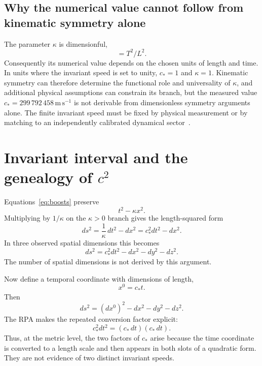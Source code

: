 \documentclass[11pt,a4paper]{article}
\newcommand{\kpar}{\kappa}
\newcommand{\cstar}{c_{\!*}}
\begin{document}
\subsection{Why the numerical value cannot follow from kinematic symmetry alone}
The parameter $\kpar$ is dimensionful,
\begin{equation}
[\kpar]=T^2/L^2.
\end{equation}
Consequently its numerical value depends on the chosen units of length and time. In units where the invariant speed is set to unity, $\cstar=1$ and $\kpar=1$. Kinematic symmetry can therefore determine the functional role and universality of $\kpar$, and additional physical assumptions can constrain its branch, but the measured value $\cstar=299\,792\,458\,\mathrm{m\,s^{-1}}$ is not derivable from dimensionless symmetry arguments alone. The finite invariant speed must be fixed by physical measurement or by matching to an independently calibrated dynamical sector~\cite{pelissetto2015,pal2003}.

\section{Invariant interval and the genealogy of \texorpdfstring{$c^2$}{c squared}}
Equations~\eqref{eq:boosts} preserve
\begin{equation}
t^2-\kpar x^2.
\end{equation}
Multiplying by $1/\kpar$ on the $\kpar>0$ branch gives the length-squared form
\begin{equation}
ds^2=\frac{1}{\kpar}\,dt^2-dx^2
=\cstar^2dt^2-dx^2.
\label{eq:interval1d}
\end{equation}
In three observed spatial dimensions this becomes
\begin{equation}
ds^2=\cstar^2dt^2-dx^2-dy^2-dz^2.
\label{eq:interval3d}
\end{equation}
The number of spatial dimensions is not derived by this argument.

Now define a temporal coordinate with dimensions of length,
\begin{equation}
x^0=\cstar t.
\end{equation}
Then
\begin{equation}
ds^2=(dx^0)^2-dx^2-dy^2-dz^2.
\label{eq:metricx0}
\end{equation}
The RPA makes the repeated conversion factor explicit:
\begin{equation}
\cstar^2dt^2=(\cstar\,dt)(\cstar\,dt).
\label{eq:cdt}
\end{equation}
Thus, at the metric level, the two factors of $\cstar$ arise because the time coordinate is converted to a length scale and then appears in both slots of a quadratic form. They are not evidence of two distinct invariant speeds.
\end{document}
